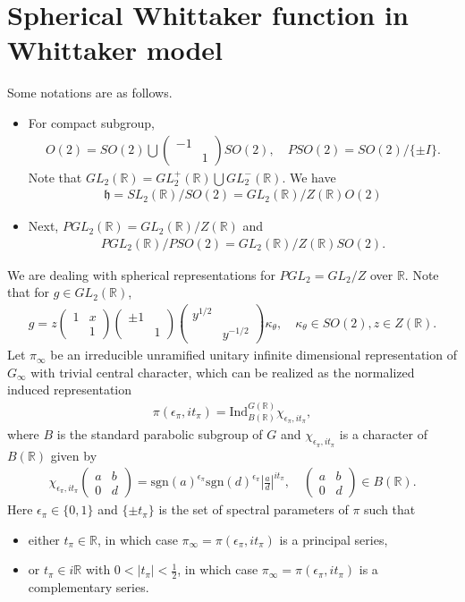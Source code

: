 \documentclass[11pt,reqno]{amsart}
\newcommand{\bna}{\begin{eqnarray*}}
\newcommand{\ena}{\end{eqnarray*}}
\newcommand{\bma}{\begin{pmatrix}}
\newcommand{\ema}{\end{pmatrix}}
\newcommand{\mk}{\mathfrak}
\def\R{\mathbb{R}}
\theoremstyle{definition}
\newcommand{\bit}{\begin{itemize}}
\newcommand{\eit}{\end{itemize}}
\begin{document}
\section{Spherical Whittaker function in Whittaker model}\label{appendix-spherical-whittaker-model}
Some notations are as follows.
\bit
\item For compact subgroup,
\bna
O(2)=SO(2)\bigcup\bma -1\\&1\ema SO(2),\quad
PSO(2)= SO(2)/\{\pm I\}.
\ena
Note that $GL_2(\R)=GL_2^+(\R)\bigcup GL_2^{-}(\R)$. We have
\bna
\mk h=SL_2(\R)/SO(2)=GL_2(\R)/Z(\R)O(2)
\ena
\item  Next, $PGL_2(\R)=GL_2(\R)/Z(\R)$ and
\bna
 PGL_2(\R)/PSO(2)=GL_2(\R)/Z(\R)SO(2).
\ena
\eit
We are dealing with spherical representations for $PGL_2=GL_2/Z$ over $\R$.
Note that for $g\in GL_2(\R)$,
\bna
g=z\bma 1&x\\&1\ema
\bma\pm 1\\&1\ema
\bma y^{1/2}\\&y^{-1/2}\ema \kappa_\theta,
\quad \kappa_\theta\in SO(2), z\in Z(\R).
\ena
Let
$\pi_\infty$ be an irreducible unramified unitary
infinite dimensional representation of $G_\infty$
with trivial central character,
which can be realized as the normalized induced representation
\bna
\pi(\epsilon_\pi,it_\pi)=\mathrm{Ind}_{B(\R)}^{G(\R)}\chi_{\epsilon_\pi,it_\pi},
\ena
where $B$ is the standard parabolic subgroup of $G$ and
$\chi_{\epsilon_\pi,it_\pi}$ is a character of $B(\R)$ given by
\bna
\chi_{\epsilon_\pi,it_\pi} \bma a&b\\0&d\ema=\mathrm{sgn}(a)^{\epsilon_{\pi}}\mathrm{sgn}(d)^{\epsilon_{\pi}}
\left|\frac{a}{d}\right|^{it_\pi},\quad \bma a&b\\0&d\ema\in B(\R).
\ena
Here $\epsilon_\pi\in\{0,1\}$ and $\{\pm t_\pi\}$ is the  set of spectral parameters of $\pi$ such that
\bit
\item either $t_\pi\in \R$, in which case $\pi_\infty=\pi(\epsilon_{\pi},it_{\pi})$ is a principal series,
\item or $t_\pi\in i\R$ with $0<|t_\pi|<\frac{1}{2}$,
 in which case $\pi_\infty=\pi(\epsilon_{\pi},it_{\pi})$
is a complementary series.
\eit
\end{document}
